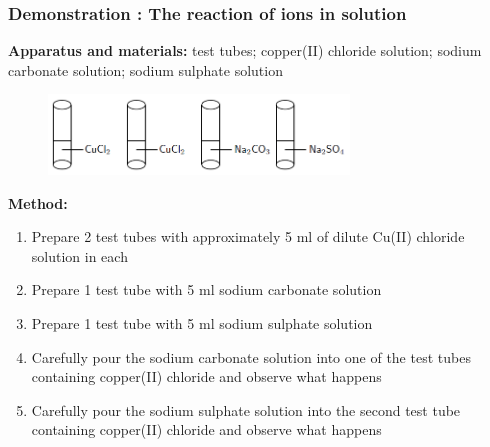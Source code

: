             \subsubsection{ Demonstration : The reaction of ions in solution       }
            \nopagebreak
            \label{m38719*id339954}\noindent{}\textbf{Apparatus and materials:}
         test tubes; copper(II) chloride solution; sodium carbonate solution; sodium sulphate solution\par 
      \label{m38719*id339975}
    \setcounter{subfigure}{0}
	\begin{figure}[H] %
    \begin{center}
    \label{m38719*id339978!!!underscore!!!media}\label{m38719*id339978!!!underscore!!!printimage}\includegraphics[width=8cm]{col11305.imgs/m38719_CG10C8_004.png} %
      \vspace{2pt}
    \vspace{.1in}
    \end{center}
 \end{figure}       
      \par 
      \label{m38719*id339985}\noindent{}\textbf{Method:}
        \newline
      \label{m38719*id339992}\begin{enumerate}[noitemsep, label=\textbf{\arabic*}. ] 
            \label{m38719*uid60}\item Prepare 2 test tubes with approximately 5 ml of dilute Cu(II) chloride solution in each
\label{m38719*uid61}\item Prepare 1 test tube with 5 ml sodium carbonate solution
\label{m38719*uid62}\item Prepare 1 test tube with 5 ml sodium sulphate solution
\label{m38719*uid63}\item Carefully pour the sodium carbonate solution into one of the test tubes containing copper(II) chloride and observe what happens
\label{m38719*uid64}\item Carefully pour the sodium sulphate solution into the second test tube containing copper(II) chloride and observe what happens
\end{enumerate}
